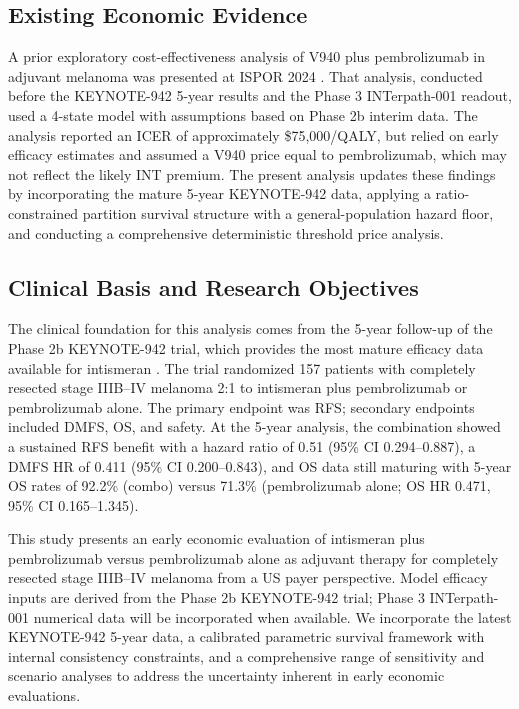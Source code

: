\documentclass[12pt,a4paper]{article}
\begin{document}
\subsection{Existing Economic Evidence}

A prior exploratory cost-effectiveness analysis of V940 plus \mbox{pembrolizumab} in adjuvant melanoma was presented at ISPOR 2024 \cite{mclean2024}. That analysis, conducted before the \mbox{KEYNOTE-942} 5-year results and the Phase 3 \mbox{INTerpath-001} readout, used a 4-state model with assumptions based on Phase 2b interim data. The analysis reported an ICER of approximately \$75,000/QALY, but relied on early efficacy estimates and assumed a V940 price equal to \mbox{pembrolizumab}, which may not reflect the likely INT premium. The present analysis updates these findings by incorporating the mature 5-year \mbox{KEYNOTE-942} data, applying a ratio-constrained partition survival structure with a general-population hazard floor, and conducting a comprehensive deterministic threshold price analysis.

\subsection{Clinical Basis and Research Objectives}

The clinical foundation for this analysis comes from the 5-year follow-up of the Phase 2b \mbox{KEYNOTE-942} trial, which provides the most mature efficacy data available for intismeran \cite{khattak2026}. The trial randomized 157 patients with completely resected stage IIIB--IV melanoma 2:1 to intismeran plus \mbox{pembrolizumab} or \mbox{pembrolizumab} alone. The primary endpoint was RFS; secondary endpoints included DMFS, OS, and safety. At the 5-year analysis, the combination showed a sustained RFS benefit with a hazard ratio of 0.51 (95\% CI 0.294--0.887), a DMFS HR of 0.411 (95\% CI 0.200--0.843), and OS data still maturing with 5-year OS rates of 92.2\% (combo) versus 71.3\% (\mbox{pembrolizumab} alone; OS HR 0.471, 95\% CI 0.165--1.345).

This study presents an early economic evaluation of intismeran plus \mbox{pembrolizumab} versus \mbox{pembrolizumab} alone as adjuvant therapy for completely resected stage IIIB--IV melanoma from a US payer perspective. Model efficacy inputs are derived from the Phase 2b \mbox{KEYNOTE-942} trial; Phase 3 \mbox{INTerpath-001} numerical data will be incorporated when available. We incorporate the latest \mbox{KEYNOTE-942} 5-year data, a calibrated parametric survival framework with internal consistency constraints, and a comprehensive range of sensitivity and scenario analyses to address the uncertainty inherent in early economic evaluations.
\end{document}
